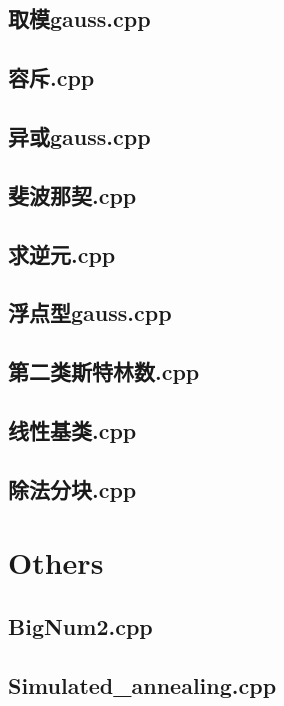 \subsection{取模gauss.cpp}

\subsection{容斥.cpp}

\subsection{异或gauss.cpp}

\subsection{斐波那契.cpp}

\subsection{求逆元.cpp}

\subsection{浮点型gauss.cpp}

\subsection{第二类斯特林数.cpp}

\subsection{线性基类.cpp}

\subsection{除法分块.cpp}

\section{Others}
\subsection{BigNum2.cpp}

\subsection{Simulated\_annealing.cpp}

